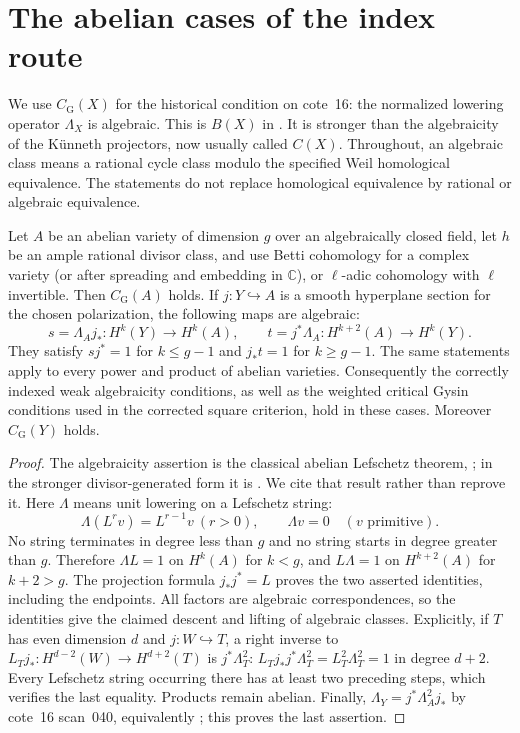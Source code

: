 \section{The abelian cases of the index route}
\label{sec:abelian}

We use $C_{\mathrm G}(X)$ for the historical condition on cote~16:
the normalized lowering operator $\Lambda_X$ is algebraic.  This is
$B(X)$ in \cite[\S2]{Kleiman1968}.  It is stronger than the algebraicity
of the K\"unneth projectors, now usually called $C(X)$.
Throughout, an algebraic class means a rational cycle class modulo the
specified Weil homological equivalence.  The statements do not replace
homological equivalence by rational or algebraic equivalence.

\begin{proposition}
Let $A$ be an abelian variety of dimension $g$ over an algebraically closed
field, let $h$ be an ample rational divisor class, and use Betti cohomology
for a complex variety (or after spreading and embedding in $\mathbb C$),
or $\ell$-adic cohomology with $\ell$ invertible.
Then $C_{\mathrm G}(A)$ holds.  If $j:Y\hookrightarrow A$ is a smooth
hyperplane section for the chosen polarization, the following maps are
algebraic:
\[
 s=\Lambda_A j_*:H^k(Y)\longrightarrow H^k(A),\qquad
 t=j^*\Lambda_A:H^{k+2}(A)\longrightarrow H^k(Y).
\]
They satisfy $sj^*=1$ for $k\leq g-1$ and $j_*t=1$ for $k\geq g-1$.
The same statements apply to every power and product of abelian varieties.
Consequently the correctly indexed weak algebraicity conditions, as well
as the weighted critical Gysin conditions used in the corrected square
criterion, hold in these cases.  Moreover $C_{\mathrm G}(Y)$ holds.
\end{proposition}
\begin{proof}
The algebraicity assertion is the classical abelian Lefschetz theorem,
\cite[Theorem~2A11]{Kleiman1968}; in the stronger divisor-generated form it
is \cite[Theorem~5.9, with the author's correction to its proof]{Milne1999a}.
We cite that result rather than reprove it.  Here $\Lambda$ means unit
lowering on a Lefschetz string:
\[
 \Lambda(L^r v)=L^{r-1}v\ (r>0),\qquad \Lambda v=0
 \quad(v\text{ primitive}).
\]
No string terminates in degree less than $g$ and no string starts in degree
greater than $g$.  Therefore $\Lambda L=1$ on $H^k(A)$ for $k<g$, and
$L\Lambda=1$ on $H^{k+2}(A)$ for $k+2>g$.  The projection formula
$j_*j^*=L$ proves the two asserted identities, including the endpoints.
All factors are algebraic correspondences, so the identities give the
claimed descent and lifting of algebraic classes.  Explicitly, if $T$ has
even dimension $d$ and $j:W\hookrightarrow T$, a right inverse to
$L_Tj_*:H^{d-2}(W)\to H^{d+2}(T)$ is $j^*\Lambda_T^2$:
$L_Tj_*j^*\Lambda_T^2=L_T^2\Lambda_T^2=1$ in degree $d+2$.
Every Lefschetz string occurring there has at least two preceding steps,
which verifies the last equality.  Products remain abelian.  Finally,
$\Lambda_Y=j^*\Lambda_A^2j_*$ by cote~16 scan~040, equivalently
\cite[Proposition~2.12]{Kleiman1968}; this proves the last assertion.
\end{proof}

